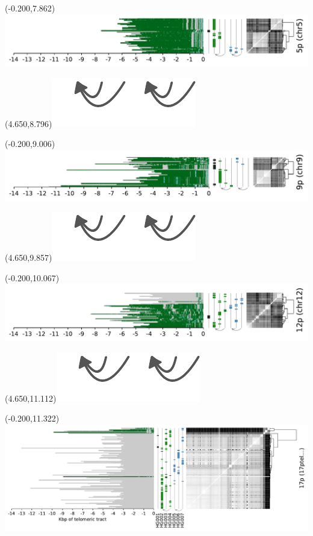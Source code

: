 \documentclass{article}
\begin{document}
\begin{textblock}{13}(-0.200,7.862)\includegraphics{Figure_4/chr5.pdf}\end{textblock}
\begin{textblock}{13}(4.650,8.796)\includegraphics[width=.81in,keepaspectratio]{Figure_4/fatter-arrows.pdf}\end{textblock}
\begin{textblock}{13}(-0.200,9.006)\includegraphics{Figure_4/chr9.pdf}\end{textblock}
\begin{textblock}{13}(4.650,9.857)\includegraphics[width=.81in,keepaspectratio]{Figure_4/fatter-arrows.pdf}\end{textblock}
\begin{textblock}{13}(-0.200,10.067)\includegraphics{Figure_4/chr12.pdf}\end{textblock}
\begin{textblock}{13}(4.650,11.112)\includegraphics[width=.81in,keepaspectratio]{Figure_4/fatter-arrows.pdf}\end{textblock}
\begin{textblock}{13}(-0.200,11.322)\includegraphics{Figure_4/17ptel_1_500K_1_12_12.pdf}\end{textblock}
\end{document}
